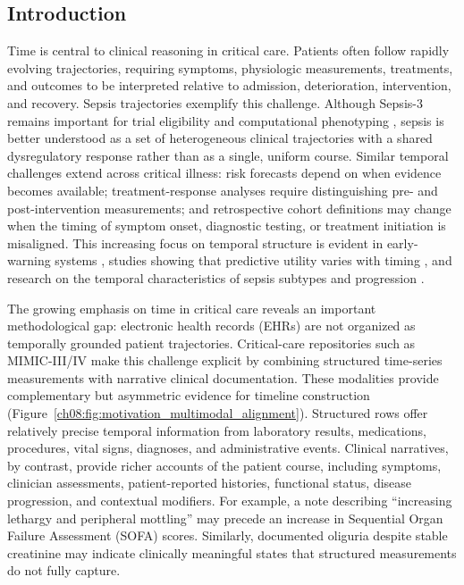 \subsection{Introduction}


Time is central to clinical reasoning in critical care.
Patients often follow rapidly evolving trajectories, requiring symptoms, physiologic measurements, treatments, and outcomes to be interpreted relative to admission, deterioration, intervention, and recovery. 
Sepsis trajectories exemplify this challenge.
Although Sepsis-3 remains important for trial eligibility and computational phenotyping \cite{kyriazopoulou2021procalcitonin,ch08:seymour2019derivation}, 
sepsis is better understood as a set of heterogeneous clinical trajectories with a shared dysregulatory response rather than as a single, uniform course. 
Similar temporal challenges extend across critical illness: risk forecasts depend on when evidence becomes available; treatment-response analyses require distinguishing pre- and post-intervention measurements; and retrospective cohort definitions may change when the timing of symptom onset, diagnostic testing, or treatment initiation is misaligned.
This increasing focus on temporal structure is evident in early-warning systems \cite{henry2022factors}, studies showing that predictive utility varies with timing \cite{kamran2024evaluation}, and research on the temporal characteristics of sepsis subtypes and progression \cite{ch08:noroozizadeh2023temporal}.


The growing emphasis on time in critical care reveals an important methodological gap: electronic health records (EHRs) are not organized as temporally grounded patient trajectories.
Critical-care repositories such as MIMIC-III/IV \cite{ch08:johnson2016mimic,ch08:johnson2023mimic} make this challenge explicit by combining structured time-series measurements with narrative clinical documentation.
These modalities provide complementary but asymmetric evidence for timeline construction (Figure~\ref{ch08:fig:motivation_multimodal_alignment}).
Structured rows offer relatively precise temporal information from laboratory results, medications, procedures, vital signs, diagnoses, and administrative events.
Clinical narratives, by contrast, provide richer accounts of the patient course, including symptoms, clinician assessments, patient-reported histories, functional status, disease progression, and contextual modifiers.
For example, a note describing ``increasing lethargy and peripheral mottling'' may precede an increase in Sequential Organ Failure Assessment (SOFA) scores.
Similarly, documented oliguria despite stable creatinine may indicate clinically meaningful states that structured measurements do not fully capture. 

